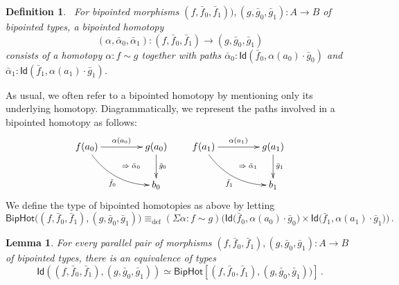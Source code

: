 \documentclass[reqno,10pt,a4paper,oneside]{amsart}
\numberwithin{equation}{section}
\theoremstyle{mythm}
\newtheorem{lemma}[theorem]{Lemma}
\theoremstyle{mydef}
\newtheorem{definition}[theorem]{Definition}
\theoremstyle{myrmk}
\newcommand{\deq}{\equiv}
\newcommand{\defeq}{\deq_{\mathrm{def}}}
\newcommand{\co}{\colon}
\newcommand{\ct}{\cdot}
\newcommand{\Id}{\mathsf{Id}}
\begin{document}
\begin{definition}\ \label{thm:biphomotopy} For bipointed morphisms $(f, \bar{f}_0, \bar{f}_1)) , (g, \bar{g}_0, \bar{g}_1) \co A \to B$ of bipointed types, a \emph{bipointed homotopy} 
\[
(\alpha, \bar{\alpha}_0, \bar{\alpha}_1) \co (f, \bar{f}_0, \bar{f}_1) \to  (g, \bar{g}_0, \bar{g}_1)
\] 
consists of a homotopy $\alpha \co  f \sim g$ together with paths
$\bar{\alpha}_0 \co  \Id(\bar{f}_0, \alpha(a_0)  \cdot \bar{g}_0)$ and $\bar{\alpha}_1 \co \Id( \bar{f}_1 ,  \alpha(a_1) \cdot \bar{g}_1)$.
\end{definition}

As usual, we often refer to a bipointed homotopy by mentioning only its underlying homotopy.
Diagrammatically, we represent the paths involved in a bipointed homotopy as follows:
\[
\xymatrix@C=1.5cm{
f(a_0) \ar[r]^{\alpha(a_0)}  \ar@/_1pc/[dr]_{\bar{f}_0}  
\ar@{}[dr]|{\qquad \Rightarrow \; \bar{\alpha}_0}  & g(a_0) \ar[d]^{\bar{g}_0}  \\ 
 & b_0 } \qquad
 \xymatrix@C=1.5cm{
f(a_1) \ar[r]^{\alpha(a_1)}  \ar@/_1pc/[dr]_{\bar{f}_1}  
\ar@{}[dr]|{\qquad \Rightarrow \; \bar{\alpha}_1}  & g(a_1) \ar[d]^{\bar{g}_1}  \\ 
 & b_1 }
 \] 
We define the type of bipointed homotopies as above by letting
\[
 \mathsf{BipHot}  \big( (f,\bar{f}_0, \bar{f}_1), (g, \bar{g}_0, \bar{g}_1) \big)   \defeq   
 (\Sigma \alpha \co f \sim g)  \big( 
  \Id\big( \bar{f}_0 ,  \alpha(a_0)  \ct \bar{g}_0 \big) \times 
  \Id \big( \bar{f}_1,  \alpha(a_1) \ct  \bar{g}_1 \big) \big) \, .
\]


\begin{lemma} \label{BoolHomSpace} 
For every parallel pair of morphisms $(f, \bar{f}_0, \bar{f}_1), (g, \bar{g}_0, \bar{g}_1) \co A \to B$ of bipointed types, there is an equivalence of types
\[
\Id( (f, \bar{f}_0, \bar{f}_1), (g, \bar{g}_0, \bar{g}_1) ) \simeq \mathsf{BipHot}[ (f, \bar{f}_0, \bar{f}_1), (g, \bar{g}_0, \bar{g}_1) ) ] \, .
\]
\end{lemma}
\end{document}
